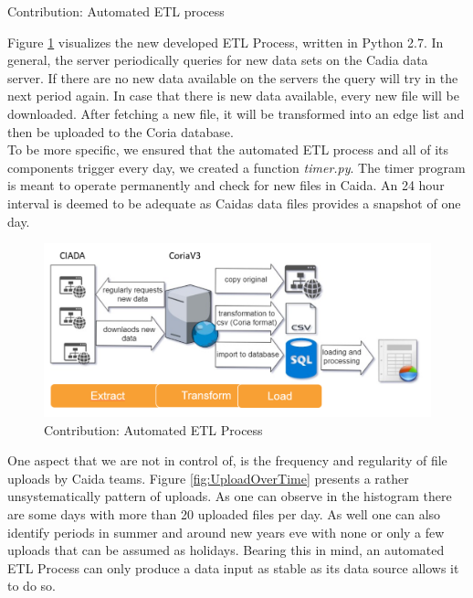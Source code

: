 \documentclass[conference, 11pt]{IEEEtran}
\begin{document}
\begin{subsection}{Contribution: Automated ETL process} \label{ssec:contribution}

Figure \ref{fig:etl2} visualizes the new developed ETL Process, written in Python 2.7. In general, the server periodically queries for new data sets on the Cadia data server. If there are no new data available on the servers the query will try in the next period again. 
In case that there is new data available, every new file will be downloaded. After fetching a new file, it will be transformed into an edge list and then be uploaded to the Coria database. \\ 

To be more specific, we ensured that the automated ETL process and all of its components trigger every day, we created a function \textit{timer.py}. The timer program is meant to operate permanently and check for new files in Caida. An 24 hour interval is deemed to be adequate as Caida\textquotesingle s data files provides a snapshot of one day. \\ 

\vspace{0.5cm}
\begin{figure}[H]
\centerline{\includegraphics[width=\columnwidth]{Graphics/ETL2.png}}
\caption{Contribution: Automated ETL Process}
\label{fig:etl2}
\end{figure}\vspace{0.5cm}


One aspect that we are not in control of, is the frequency and regularity of file uploads by Caida teams. Figure \ref{fig:UploadOverTime} presents a rather unsystematically pattern of uploads. As one can observe in the histogram there are some days with more than 20 uploaded files per day. As well one can also identify periods in summer and around new years eve with none or only a few uploads that can be assumed as holidays. Bearing this in mind, an automated ETL Process can only produce a data input as stable as its data source allows it to do so.


\end{subsection}
\end{document}
